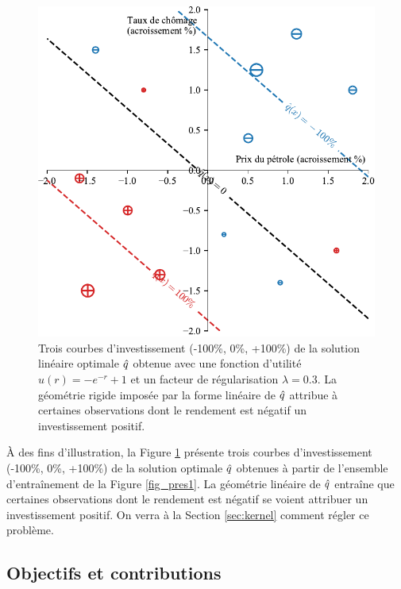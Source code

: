 \begin{figure}[p]
  \centering
  \includegraphics[width=\textwidth]{../experiments/fig/pres/pres3_fr.pdf}
  \caption[Décision linéaire]{Trois courbes d'investissement (-100\%, 0\%, +100\%) de la
    solution linéaire optimale $\hat q$ obtenue avec une fonction d'utilité
    $u(r) = -e^{-r}+1$ et un facteur de régularisation $\lambda = 0.3$. La géométrie rigide
    imposée par la forme linéaire de $\hat q$ attribue à certaines observations dont le
    rendement est négatif un investissement positif.}
  \label{fig_pres3}
\end{figure}

À des fins d'illustration, la Figure \ref{fig_pres3} présente trois courbes
d'investissement (-100\%, 0\%, +100\%) de la solution optimale $\hat q$ obtenues à partir de
l'ensemble d'entraînement de la Figure \ref{fig_pres1}. La géométrie linéaire de $\hat q$
entraîne que certaines observations dont le rendement est négatif se voient attribuer un
investissement positif. On verra à la Section \ref{sec:kernel} comment régler ce problème.



\subsection{Objectifs et contributions}

